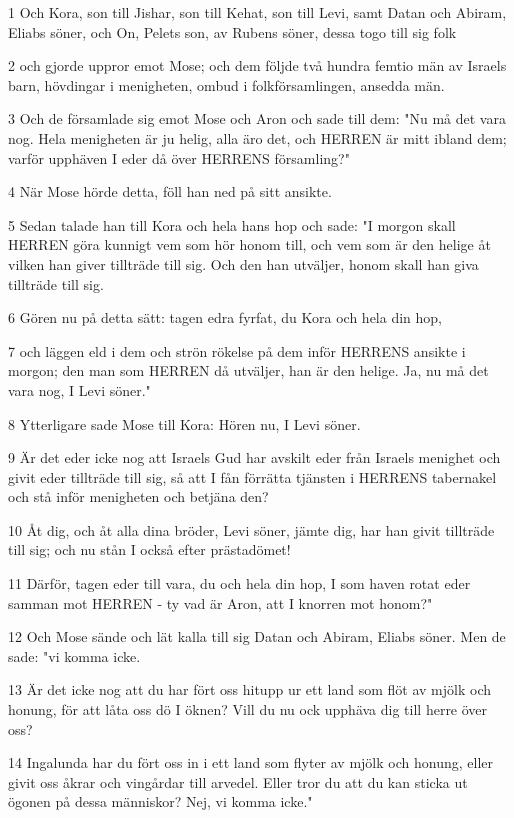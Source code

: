\par 1 Och Kora, son till Jishar, son till Kehat, son till Levi, samt Datan och Abiram, Eliabs söner, och On, Pelets son, av Rubens söner, dessa togo till sig folk
\par 2 och gjorde uppror emot Mose; och dem följde två hundra femtio män av Israels barn, hövdingar i menigheten, ombud i folkförsamlingen, ansedda män.
\par 3 Och de församlade sig emot Mose och Aron och sade till dem: "Nu må det vara nog. Hela menigheten är ju helig, alla äro det, och HERREN är mitt ibland dem; varför upphäven I eder då över HERRENS församling?"
\par 4 När Mose hörde detta, föll han ned på sitt ansikte.
\par 5 Sedan talade han till Kora och hela hans hop och sade: "I morgon skall HERREN göra kunnigt vem som hör honom till, och vem som är den helige åt vilken han giver tillträde till sig. Och den han utväljer, honom skall han giva tillträde till sig.
\par 6 Gören nu på detta sätt: tagen edra fyrfat, du Kora och hela din hop,
\par 7 och läggen eld i dem och strön rökelse på dem inför HERRENS ansikte i morgon; den man som HERREN då utväljer, han är den helige. Ja, nu må det vara nog, I Levi söner."
\par 8 Ytterligare sade Mose till Kora: Hören nu, I Levi söner.
\par 9 Är det eder icke nog att Israels Gud har avskilt eder från Israels menighet och givit eder tillträde till sig, så att I fån förrätta tjänsten i HERRENS tabernakel och stå inför menigheten och betjäna den?
\par 10 Åt dig, och åt alla dina bröder, Levi söner, jämte dig, har han givit tillträde till sig; och nu stån I också efter prästadömet!
\par 11 Därför, tagen eder till vara, du och hela din hop, I som haven rotat eder samman mot HERREN - ty vad är Aron, att I knorren mot honom?"
\par 12 Och Mose sände och lät kalla till sig Datan och Abiram, Eliabs söner. Men de sade: "vi komma icke.
\par 13 Är det icke nog att du har fört oss hitupp ur ett land som flöt av mjölk och honung, för att låta oss dö I öknen? Vill du nu ock upphäva dig till herre över oss?
\par 14 Ingalunda har du fört oss in i ett land som flyter av mjölk och honung, eller givit oss åkrar och vingårdar till arvedel. Eller tror du att du kan sticka ut ögonen på dessa människor? Nej, vi komma icke."
